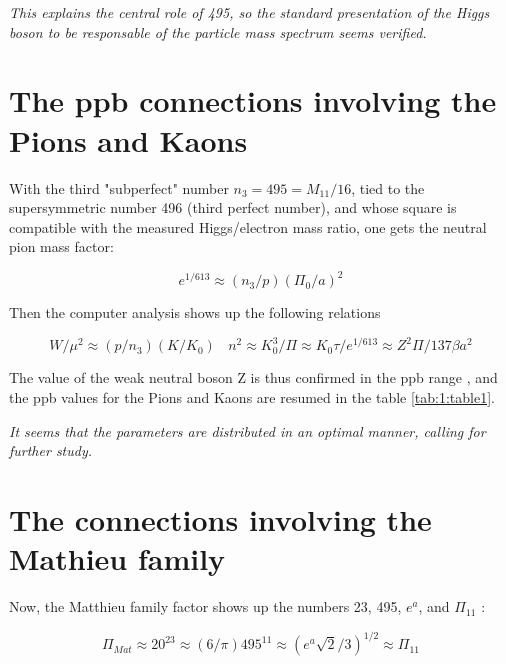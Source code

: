 \documentclass[a4paper,9pt]{article}
\begin{document}
\textit{This explains the central role of 495, so the standard presentation of the Higgs boson to be responsable of the particle mass spectrum seems verified.}







\section{The ppb connections involving the Pions and Kaons}

With the third "subperfect" number $n_3 = 495 = M_{11}/16$, tied to the supersymmetric number 496 (third perfect number), and whose square is compatible with the measured Higgs/electron mass ratio, one gets the neutral pion mass factor:  

\begin{equation}
e^{1/613} \approx (n_3/p)(\Pi_0/a)^2  
\end{equation}

Then the computer analysis shows up the following relations

\begin{equation}
W/\mu^2 \approx (p/n_3)(K/K_0)~~~~   n^2 \approx K_0^3/\Pi  \approx K_0 \tau/e^{1/613} \approx Z^2\Pi/137\beta a^2
\end{equation}


The value of the weak neutral boson Z is thus confirmed in the ppb range \cite{Sanchez}, and the ppb values for the Pions and Kaons are resumed in the table \ref{tab:1:table1}.  


\textit{It seems that the parameters are distributed in an optimal manner, calling for further study.}






\section{The connections involving the Mathieu family}


Now, the Matthieu family factor shows up the numbers 23, 495, $e^a$, and $\Pi_{11}$ :

\begin{equation}
\Pi_{Mat} \approx 20^{23} \approx (6/\pi) 495^{11} \approx (e^a \sqrt 2 /3)^{1/2} \approx \Pi_{11} 
\end{equation}
\end{document}
